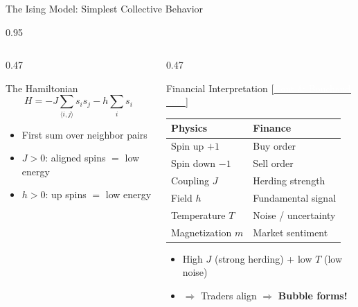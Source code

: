 \documentclass[9pt, aspectratio=169, t]{beamer}
\begin{document}
\begin{frame}{The Ising Model: Simplest Collective Behavior}
\begin{cminipage}{0.95\textwidth}
{\begin{columns}[T]
\begin{column}{0.47\textwidth}
            \begin{alertblock}{The Hamiltonian}
                $$H = -J \sum_{\langle i,j \rangle} s_i s_j - h \sum_i s_i$$
                \begin{itemize}\setlength{\itemsep}{0pt}
                    \item First sum over neighbor pairs
                    \item $J > 0$: aligned spins $=$ low energy
                    \item $h > 0$: up spins $=$ low energy
                \end{itemize}
            \end{alertblock}
        \end{column}
        \begin{column}{0.47\textwidth}
            \begin{exampleblock}{Financial Interpretation {\scriptsize[\href{https://doi.org/10.1017/S1365100500015029}{\textcolor{white}{Cont \& Bouchaud, 2000}}]}}
                \begin{center}
                    \begin{tabular}{ll}
                        \toprule
                        \textbf{Physics} & \textbf{Finance} \\
                        \midrule
                        Spin up $+1$ & Buy order \\
                        Spin down $-1$ & Sell order \\
                        Coupling $J$ & Herding strength \\
                        Field $h$ & Fundamental signal \\
                        Temperature $T$ & Noise / uncertainty \\
                        Magnetization $m$ & Market sentiment \\
                        \bottomrule
                    \end{tabular}
                \end{center}
            \end{exampleblock}

            \begin{block}{}
                \begin{itemize}\setlength{\itemsep}{0pt}
                    \item High $J$ (strong herding) + low $T$ (low noise)
                    \item $\Rightarrow$ Traders align $\Rightarrow$ \textbf{Bubble forms!}
                \end{itemize}
            \end{block}
        \end{column}
    \end{columns}
    }
    \end{cminipage}
\end{frame}
\end{document}
